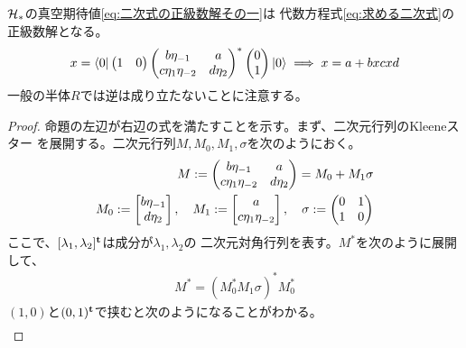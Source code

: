 {	\begin{proposition}[二次式の正級数解]\label{prop:二次式の正級数解} %
		${{\mathcal{H}}}_*$の真空期待値\eqref{eq:二次式の正級数解その一}は
		代数方程式\eqref{eq:求める二次式}の正級数解となる。
		\begin{equation*}\begin{split}
			x = \mathinner{\langle{0}|}\begin{pmatrix}
				1 & 0
			\end{pmatrix}\begin{pmatrix}
				b\eta_{-1} & a \\
				c\eta_1\eta_{-2} & d\eta_2
			\end{pmatrix}^*\begin{pmatrix}
				0 \\ 1
			\end{pmatrix}\mathinner{|{0}\rangle} \implies x = a + bxcxd
		\end{split}\end{equation*}
		一般の半体$R$では逆は成り立たないことに注意する。
	\end{proposition} %
	\begin{proof} %
		命題の左辺が右辺の式を満たすことを示す。まず、二次元行列のKleeneスター
		を展開する。二次元行列$M,M_0,M_1,\sigma$を次のようにおく。
		\begin{equation*}\begin{split}
			M := \begin{pmatrix}
				b\eta_{-1} & a \\
				c\eta_1\eta_{-2} & d\eta_2
			\end{pmatrix} = M_0 + M_1\sigma \\
			M_0 := \begin{bmatrix}{b\eta_{-1}}\\{d\eta_2}\end{bmatrix}
			,\quad M_1 := \begin{bmatrix}{a}\\{c\eta_1\eta_{-2}}\end{bmatrix}
			,\quad \sigma := \begin{pmatrix}
				0 & 1 \\ 1 & 0
			\end{pmatrix}
		\end{split}\end{equation*}
		ここで、$[\lambda_1,\lambda_2]^{\mathbf{t}}$は成分が$\lambda_1,\lambda_2$の
		二次元対角行列を表す。$M^*$を次のように展開して、
		\begin{equation*}\begin{split}
			M^* = (M_0^*M_1\sigma)^*M_0^*
		\end{split}\end{equation*}
		$(1,0)$と$(0,1)^{\mathbf{t}}$で挟むと次のようになることがわかる。
		\begin{equation*}\begin{split}

\end{split}
\end{equation*}
\end{proof}}
